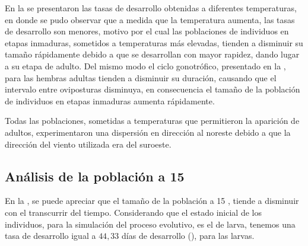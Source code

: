 En la  se presentaron las tasas de desarrollo obtenidas a
diferentes temperaturas, en donde se pudo observar que a medida que la temperatura aumenta, las
tasas de desarrollo son menores, motivo por el cual las poblaciones de individuos en etapas
inmaduras, sometidos a temperaturas más elevadas, tienden a disminuir su tamaño rápidamente debido
a que se desarrollan con mayor rapidez, dando lugar a su etapa de adulto. Del mismo modo el ciclo
gonotrófico, presentado en la , para las hembras adultas
tienden a disminuir su duración, causando que el intervalo entre oviposturas disminuya, en
consecuencia el tamaño de la población de individuos en etapas inmaduras aumenta rápidamente.

Todas las poblaciones, sometidas a temperaturas que permitieron la aparición de adultos,
experimentaron una dispersión en dirección al noreste debido a que la dirección del viento utilizada era del suroeste.


\subsection{Análisis de la población a 15 \textcelsius}
En la , se puede apreciar que el tamaño de la población a 15
\textcelsius, tiende a disminuir con el transcurrir del tiempo. Considerando que el estado inicial
de los individuos, para la simulación del proceso evolutivo, es el de larva, tenemos una tasa de
desarrollo igual a $44,33$ días de desarrollo
(), para las larvas.

